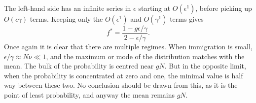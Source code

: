 The left-hand side has an infinite series in $\epsilon$ starting at $O(\epsilon^1)$, before picking up $O(\epsilon\gamma)$ terms. 
Keeping only the $O(\epsilon^1)$ and $O(\gamma^1)$ terms gives
\begin{equation}
	f^* = \frac{1-g\epsilon/\gamma}{2-\epsilon/\gamma}. %
\end{equation}
Once again it is clear that there are multiple regimes. 
When immigration is small, $\epsilon/\gamma \approx N\nu \ll 1$, and the maximum or mode of the distribution matches with the mean. 
The bulk of the probability is centred near $g N$. 
But in the opposite limit, when the probability is concentrated at zero and one, the minimal value is half way between these two. 
No conclusion should be drawn from this, as it is the point of least probability, and anyway the mean remains $gN$. 

